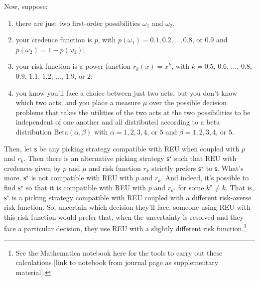 \documentclass[a4paper]{article}
\newcommand\s{\mathsf{s}}
\newcommand{\todoinfo}[2][]{\todo[backgroundcolor=orange!80,bordercolor=black,linecolor=gray!80, #1,inline,caption={}]{#2}}
\newenvironment{CCM rewritten}
{\begingroup\color{blue}} %
{\endgroup}              %
\begin{document}


Now, suppose:
\begin{enumerate}[{\normalfont (i)}]
\item there are just two first-order possibilities $\omega_1$ and $\omega_2$,
\item your credence function is $p$, with $p(\omega_1) = 0.1, 0.2, \ldots, 0.8$, or $0.9$ and $p(\omega_2) = 1-p(\omega_1)$;
\item your risk function is a power function $r_k(x) = x^k$, with $k = 0.5$, $0.6$, $\ldots$, $0.8$, $0.9$, $1.1$, $1.2$, $\ldots$, $1.9$, or $2$;
\item you know you'll face a choice between just two acts, but you don't know which two acts, and you place a measure $\mu$ over the possible decision problems that takes the utilities of the two acts at the two possibilities to be independent of one another and all distributed according to a beta distribution $\mathrm{Beta}(\alpha, \beta)$ with $\alpha = 1, 2, 3, 4$, or $5$ and $\beta = 1, 2, 3, 4$, or $5$.\end{enumerate}
Then, let $\s$ be any picking strategy compatible with REU when coupled with $p$ and $r_k$. Then there is an alternative picking strategy $\s^\star$ such that REU with credences given by $p$ and $\mu$ and risk function $r_k$ strictly prefers $\s^\star$ to $\s$. What's more, $\s^\star$ is not compatible with REU with $p$ and $r_k$. And indeed, it's possible to find $\s^\star$ so that it is compatible with REU with $p$ and $r_{k^\star}$ for some $k^\star \neq k$. That is, $\s^\star$ is a picking strategy compatible with REU coupled with a different risk-averse risk function. So, uncertain which decision they'll face, someone using REU with this risk function would prefer that, when the uncertainty is resolved and they face a particular decision, they use REU with a slightly different risk function.\footnote{See the Mathematica notebook here for the tools to carry out these calculations [link to notebook from journal page as supplementary material].}%

\end{document}
